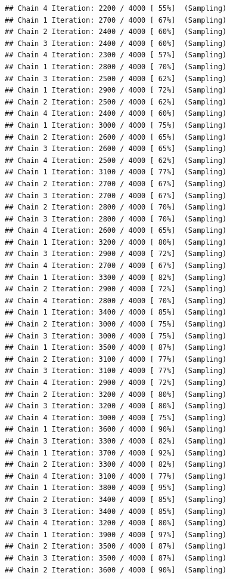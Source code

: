 \documentclass[
]{article}
\begin{document}
\begin{verbatim}
## Chain 4 Iteration: 2200 / 4000 [ 55%]  (Sampling) 
## Chain 1 Iteration: 2700 / 4000 [ 67%]  (Sampling) 
## Chain 2 Iteration: 2400 / 4000 [ 60%]  (Sampling) 
## Chain 3 Iteration: 2400 / 4000 [ 60%]  (Sampling) 
## Chain 4 Iteration: 2300 / 4000 [ 57%]  (Sampling) 
## Chain 1 Iteration: 2800 / 4000 [ 70%]  (Sampling) 
## Chain 3 Iteration: 2500 / 4000 [ 62%]  (Sampling) 
## Chain 1 Iteration: 2900 / 4000 [ 72%]  (Sampling) 
## Chain 2 Iteration: 2500 / 4000 [ 62%]  (Sampling) 
## Chain 4 Iteration: 2400 / 4000 [ 60%]  (Sampling) 
## Chain 1 Iteration: 3000 / 4000 [ 75%]  (Sampling) 
## Chain 2 Iteration: 2600 / 4000 [ 65%]  (Sampling) 
## Chain 3 Iteration: 2600 / 4000 [ 65%]  (Sampling) 
## Chain 4 Iteration: 2500 / 4000 [ 62%]  (Sampling) 
## Chain 1 Iteration: 3100 / 4000 [ 77%]  (Sampling) 
## Chain 2 Iteration: 2700 / 4000 [ 67%]  (Sampling) 
## Chain 3 Iteration: 2700 / 4000 [ 67%]  (Sampling) 
## Chain 2 Iteration: 2800 / 4000 [ 70%]  (Sampling) 
## Chain 3 Iteration: 2800 / 4000 [ 70%]  (Sampling) 
## Chain 4 Iteration: 2600 / 4000 [ 65%]  (Sampling) 
## Chain 1 Iteration: 3200 / 4000 [ 80%]  (Sampling) 
## Chain 3 Iteration: 2900 / 4000 [ 72%]  (Sampling) 
## Chain 4 Iteration: 2700 / 4000 [ 67%]  (Sampling) 
## Chain 1 Iteration: 3300 / 4000 [ 82%]  (Sampling) 
## Chain 2 Iteration: 2900 / 4000 [ 72%]  (Sampling) 
## Chain 4 Iteration: 2800 / 4000 [ 70%]  (Sampling) 
## Chain 1 Iteration: 3400 / 4000 [ 85%]  (Sampling) 
## Chain 2 Iteration: 3000 / 4000 [ 75%]  (Sampling) 
## Chain 3 Iteration: 3000 / 4000 [ 75%]  (Sampling) 
## Chain 1 Iteration: 3500 / 4000 [ 87%]  (Sampling) 
## Chain 2 Iteration: 3100 / 4000 [ 77%]  (Sampling) 
## Chain 3 Iteration: 3100 / 4000 [ 77%]  (Sampling) 
## Chain 4 Iteration: 2900 / 4000 [ 72%]  (Sampling) 
## Chain 2 Iteration: 3200 / 4000 [ 80%]  (Sampling) 
## Chain 3 Iteration: 3200 / 4000 [ 80%]  (Sampling) 
## Chain 4 Iteration: 3000 / 4000 [ 75%]  (Sampling) 
## Chain 1 Iteration: 3600 / 4000 [ 90%]  (Sampling) 
## Chain 3 Iteration: 3300 / 4000 [ 82%]  (Sampling) 
## Chain 1 Iteration: 3700 / 4000 [ 92%]  (Sampling) 
## Chain 2 Iteration: 3300 / 4000 [ 82%]  (Sampling) 
## Chain 4 Iteration: 3100 / 4000 [ 77%]  (Sampling) 
## Chain 1 Iteration: 3800 / 4000 [ 95%]  (Sampling) 
## Chain 2 Iteration: 3400 / 4000 [ 85%]  (Sampling) 
## Chain 3 Iteration: 3400 / 4000 [ 85%]  (Sampling) 
## Chain 4 Iteration: 3200 / 4000 [ 80%]  (Sampling) 
## Chain 1 Iteration: 3900 / 4000 [ 97%]  (Sampling) 
## Chain 2 Iteration: 3500 / 4000 [ 87%]  (Sampling) 
## Chain 3 Iteration: 3500 / 4000 [ 87%]  (Sampling) 
## Chain 2 Iteration: 3600 / 4000 [ 90%]  (Sampling) 

\end{verbatim}
\end{document}
